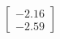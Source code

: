 \documentclass[preview]{standalone}
\begin{document}
\begin{align*}
\begin{bmatrix} -2.16 \\ -2.59 \end{bmatrix}
\end{align*}
\end{document}
